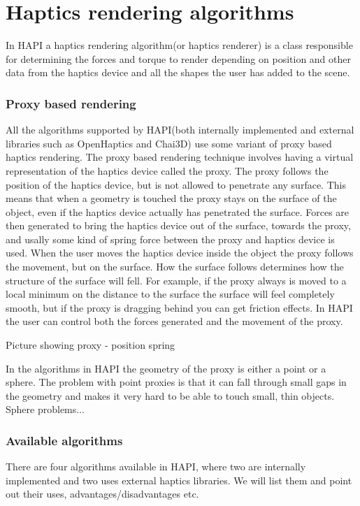 
\chapter {Haptics rendering algorithms}
In HAPI a haptics rendering algorithm(or haptics renderer) is a class
responsible for determining the forces and torque to render depending
on position and other data from the haptics device and all the shapes
the user has added to the scene. 

\subsection{Proxy based rendering}
All the algorithms supported by HAPI(both internally implemented and
external libraries such as OpenHaptics and Chai3D) use some variant of
proxy based haptics rendering. The proxy based rendering technique
involves having a virtual representation of the haptics device called
the proxy. The proxy follows the position of the haptics device, but
is not allowed to penetrate any surface. This means that when a
geometry is touched the proxy stays on the surface of the object, even
if the haptics device actually has penetrated the surface. Forces are
then generated to bring the haptics device out of the surface, towards
the proxy, and usally some kind of spring force between the proxy and
haptics device is used. When the user moves the haptics device inside
the object the proxy follows the movement, but on the surface. How the
surface follows determines how the structure of the surface will
fell. For example, if the proxy always is moved to a local minimum on
the distance to the surface the surface will feel completely smooth,
but if the proxy is dragging behind you can get friction effects. In
HAPI the user can control both the forces generated and the movement
of the proxy.

 Picture showing proxy - position spring

In the algorithms in HAPI the geometry of the proxy is either a point
or a sphere. The problem with point proxies is that it can fall
through small gaps in the geometry and makes it very hard to be able
to touch small, thin objects. Sphere problems... 

\subsection{Available algorithms}
There are four algorithms available in HAPI, where two are internally
implemented and two uses external haptics libraries. We will list them
and point out their uses, advantages/disadvantages etc.

